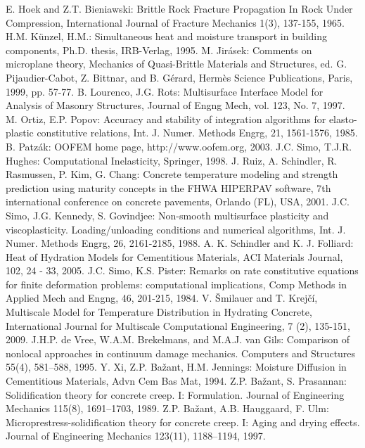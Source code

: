 \documentclass[a4paper]{article}
\begin{document}
\begin{thebibliography}{99}
 E. Hoek and Z.T. Bieniawski: Brittle Rock Fracture Propagation
In Rock Under Compression, International Journal of Fracture Mechanics
1(3), 137-155, 1965.
 H.M. K{\"u}nzel, H.M.: Simultaneous heat and
  moisture transport in building components, Ph.D. thesis, IRB-Verlag,
  1995.
 M. Jir\'{a}sek: Comments on microplane theory, Mechanics of Quasi-Brittle Materials and Structures, ed. G. Pijaudier-Cabot, Z. Bittnar, and B. G\'{e}rard, Herm\`{e}s Science Publications, Paris, 1999, pp. 57-77.
 B. Lourenco, J.G. Rots: Multisurface Interface Model for Analysis of Masonry Structures, Journal of Engng Mech, vol. 123, No. 7, 1997.
 M. Ortiz, E.P. Popov: Accuracy and stability of integration algorithms for elasto-plastic constitutive relations, Int. J. Numer. Methods Engrg, 21, 1561-1576, 1985.
 B. Patz\'ak: OOFEM home page, http://www.oofem.org, 2003.
 J.C. Simo, T.J.R. Hughes: Computational Inelasticity, Springer, 1998.
 J. Ruiz, A. Schindler, R. Rasmussen, P. Kim, G. Chang: Concrete temperature modeling and strength prediction using maturity concepts in the FHWA HIPERPAV software, 7th international conference on concrete pavements, Orlando (FL), USA, 2001.
 J.C. Simo, J.G. Kennedy, S. Govindjee: Non-smooth multisurface plasticity and viscoplasticity. Loading/unloading conditions and numerical algorithms, Int. J. Numer. Methods Engrg, 26, 2161-2185, 1988.
 A. K. Schindler and K. J. Folliard: Heat of Hydration Models for Cementitious Materials, ACI Materials Journal, 102, 24 - 33, 2005.
 J.C. Simo, K.S. Pister: Remarks on rate constitutive equations for finite deformation problems: computational implications, Comp Methods in Applied Mech and Engng, 46, 201-215, 1984.
 V. \v{S}milauer and T. Krej\v{c}\'i, Multiscale
  Model for Temperature Distribution in Hydrating Concrete,
  International Journal for Multiscale Computational Engineering, 7
  (2), 135-151, 2009.
 J.H.P. de Vree, W.A.M. Brekelmans, and M.A.J. van Gils: Comparison of nonlocal approaches in continuum damage mechanics. Computers and Structures 55(4), 581–588, 1995.
 Y. Xi, Z.P. Ba\v{z}ant, H.M. Jennings: Moisture Diffusion
  in Cementitious Materials, Advn Cem Bas Mat, 1994.
 Z.P. Ba\v{z}ant, S. Prasannan: Solidification theory for concrete creep. {I}: Formulation. Journal of Engineering Mechanics 115(8), 1691–1703, 1989.
 Z.P. Ba\v{z}ant, A.B. Hauggaard, F. Ulm: Microprestress-solidification theory for concrete creep. {I}: Aging and drying effects. Journal of Engineering Mechanics 123(11), 1188–1194, 1997.

\end{thebibliography}
\end{document}
